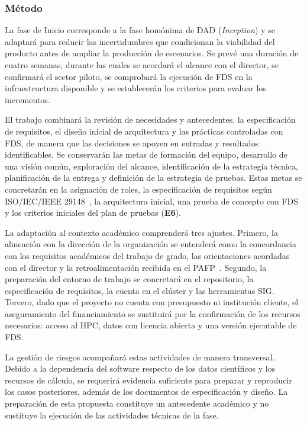 \subsubsection{Método}\label{sec:inicio-metodo}

La fase de Inicio corresponde a la fase homónima de DAD
(\textit{Inception}) y se adaptará para reducir las incertidumbres
que condicionan la viabilidad del producto antes de ampliar la
producción de escenarios. Se prevé una duración de cuatro semanas,
durante las cuales se acordará el alcance con el director, se
confirmará el sector piloto, se comprobará la ejecución de FDS en
la infraestructura disponible y se establecerán los criterios para
evaluar los incrementos.

El trabajo combinará la revisión de necesidades y antecedentes,
la especificación de requisitos, el diseño inicial de arquitectura
y las prácticas controladas con FDS, de manera que las decisiones
se apoyen en entradas y resultados identificables. Se conservarán
las metas de formación del equipo, desarrollo de una visión común,
exploración del alcance, identificación de la estrategia técnica,
planificación de la entrega y definición de la estrategia de
pruebas. Estas metas se concretarán en la asignación de roles, la
especificación de requisitos según
ISO/IEC/IEEE 29148~\cite{iso29148}, la arquitectura inicial, una
prueba de concepto con FDS y los criterios iniciales del plan de
pruebas (\textbf{E6}).

La adaptación al contexto académico comprenderá tres ajustes.
Primero, la alineación con la dirección de la organización se
entenderá como la concordancia con los requisitos académicos del
trabajo de grado, las orientaciones acordadas con el director y la
retroalimentación recibida en el PAFP~\cite{pafp2026}. Segundo, la
preparación del entorno de trabajo se concretará en el repositorio,
la especificación de requisitos, la cuenta en el clúster y las
herramientas SIG. Tercero, dado que el proyecto no cuenta con
presupuesto ni institución cliente, el aseguramiento del
financiamiento se sustituirá por la confirmación de los recursos
necesarios: acceso al HPC, datos con licencia abierta y una versión
ejecutable de FDS.

La gestión de riesgos acompañará estas actividades de manera
transversal. Debido a la dependencia del software respecto de los
datos científicos y los recursos de cálculo, se requerirá evidencia
suficiente para preparar y reproducir los casos posteriores,
además de los documentos de especificación y diseño. La preparación
de esta propuesta constituye un antecedente académico y no
sustituye la ejecución de las actividades técnicas de la fase.